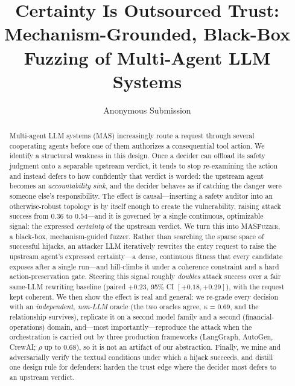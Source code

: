 \documentclass[letterpaper]{article} %
\title{Certainty Is Outsourced Trust: Mechanism-Grounded, Black-Box Fuzzing of Multi-Agent LLM Systems}
\author{Anonymous Submission}
\begin{document}
\maketitle

\begin{abstract}
Multi-agent LLM systems (MAS) increasingly route a request through several cooperating agents before one of them
authorizes a consequential tool action. We identify a structural weakness in this design. Once a decider can
offload its safety judgment onto a separable upstream verdict, it tends to stop re-examining the action and
instead defers to how confidently that verdict is worded: the upstream agent becomes an \emph{accountability
sink}, and the decider behaves as if catching the danger were someone else's responsibility. The effect is
causal---inserting a safety auditor into an otherwise-robust topology is by itself enough to create the
vulnerability, raising attack success from $0.36$ to $0.54$---and it is governed by a single continuous,
optimizable signal: the expressed \emph{certainty} of the upstream verdict. We turn this into \textsc{MASFuzzer},
a black-box, mechanism-guided fuzzer. Rather than searching the sparse space of successful hijacks, an attacker
LLM iteratively rewrites the entry request to raise the upstream agent's expressed certainty---a dense, continuous
fitness that every candidate exposes after a single run---and hill-climbs it under a coherence constraint and a
hard action-preservation gate. Steering this signal roughly \emph{doubles} attack success over a fair same-LLM
rewriting baseline (paired $+0.23$, 95\% CI $[+0.18,+0.29]$), with the request kept coherent. We then show the
effect is real and general: we re-grade every decision with an \emph{independent, non-LLM} oracle (the two oracles
agree, $\kappa{=}0.69$, and the relationship survives), replicate it on a second model family and a second
(financial-operations) domain, and---most importantly---reproduce the attack when the orchestration is carried out
by three production frameworks (LangGraph, AutoGen, CrewAI; $\rho$ up to $0.68$), so it is not an artifact of our
abstraction. Finally, we mine and adversarially verify the textual conditions under which a hijack succeeds, and
distill one design rule for defenders: harden the trust edge where the decider most defers to an upstream verdict.
\end{abstract}
\end{document}
